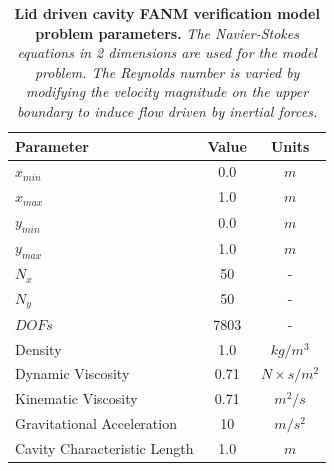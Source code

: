 \begin{table}[h!]
  \begin{center}
    \begin{tabular}{lcc}\hline\hline
      \multicolumn{1}{l}{Parameter}& 
      \multicolumn{1}{c}{Value}&
      \multicolumn{1}{c}{Units}\\\hline
      $x_{min}$ & 0.0 & $m$ \\
      $x_{max}$ & 1.0 & $m$ \\
      $y_{min}$ & 0.0 & $m$ \\
      $y_{max}$ & 1.0 & $m$ \\
      $N_x$ & 50 & - \\
      $N_y$ & 50 & - \\
      $DOFs$ & 7803 & - \\
      Density & 1.0 & $kg / m^3$ \\
      Dynamic Viscosity & 0.71 & $N \times s / m^2$ \\
      Kinematic Viscosity & 0.71 & $m^2 / s$ \\
      Gravitational Acceleration & 10 & $m / s^2$ \\
      Cavity Characteristic Length & 1.0 & $m$ \\
      \hline\hline
    \end{tabular}
  \end{center}
  \caption{\textbf{Lid driven cavity FANM verification model
      problem parameters.}  \textit{The Navier-Stokes equations in 2
      dimensions are used for the model problem. The Reynolds number
      is varied by modifying the velocity magnitude on the upper
      boundary to induce flow driven by inertial forces.}}
  \label{tab:lid_driven_parameters}
\end{table}

